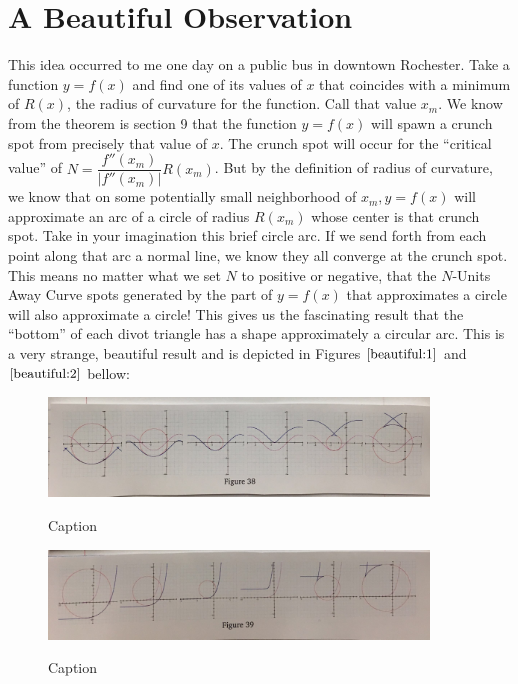 \section{A Beautiful Observation}

This idea occurred to me one day on a public bus in downtown Rochester. Take a function $y = f(x)$ and find one of its values of $x$ that coincides with a minimum of $R(x)$, the radius of curvature for the function. Call that value $x_m$. We know from the theorem is section 9 that the function $y = f(x)$ will spawn a crunch spot from precisely that value of $x$. The crunch spot will occur for the ``critical value'' of $N = \dfrac{f''(x_m)}{|f''(x_m)|} R(x_m)$. But by the definition of radius of curvature, we know that on some potentially small neighborhood of $x_m, y = f(x)$ will approximate an arc of a circle of radius $R(x_m)$ whose center is that crunch spot. Take in your imagination this brief circle arc. If we send forth from each point along that arc a normal line, we know they all converge at the crunch spot. This means no matter what we set $N$ to positive or negative, that the $N$-Units Away Curve spots generated by the part of $y = f(x)$ that approximates a circle will also approximate a circle! This gives us the fascinating result that the ``bottom'' of each divot triangle has a shape approximately a circular arc. This is a very strange, beautiful result and is depicted in Figures $\ref{beautiful:1}$ and $\ref{beautiful:2}$ bellow:

\renewcommand\w{0.9\linewidth}
\renewcommand\fw{0.9\textwidth}
\renewcommand\fh{0.25\textheight}

\begin{figure}[H]
  \centering
  \begin{minipage}[b]{\w}
    \centering
    \label{beautiful:1}
    \includegraphics[width=\fw, height=\fh, keepaspectratio]{img/11-beautiful/01.png}
    \caption{Caption}
    \vspace{4ex}
  \end{minipage}
  \begin{minipage}[b]{\w}
    \centering
    \label{beautiful:2}
    \includegraphics[width=\fw, height=\fh, keepaspectratio]{img/11-beautiful/02.png}
    \caption{Caption}
    \vspace{4ex}
  \end{minipage}
\end{figure}
